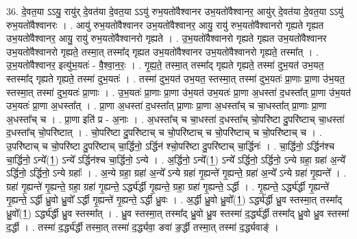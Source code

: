 \documentclass[17pt]{extarticle}
\begin{document}
36. दे॒वत॒या ऽऽयु॒ रायु॑र् दे॒वत॑या दे॒वत॒या ऽऽयु॑ रुभ॒यतो॑वैश्वानर उभ॒यतो॑वैश्वानर॒ आयु॑र् दे॒वत॑या दे॒वत॒या ऽऽयु॑ रुभ॒यतो॑वैश्वानरः । . आयु॑ रुभ॒यतो॑वैश्वानर उभ॒यतो॑वैश्वानर॒ आयु॒ रायु॑ रुभ॒यतो॑वैश्वानरो गृह्यते गृह्यत उभ॒यतो॑वैश्वानर॒ आयु॒ रायु॑ रुभ॒यतो॑वैश्वानरो गृह्यते । . उ॒भ॒यतो॑वैश्वानरो गृह्यते गृह्यत उभ॒यतो॑वैश्वानर उभ॒यतो॑वैश्वानरो गृह्यते॒ तस्मा॒त् तस्मा᳚द् गृह्यत उभ॒यतो॑वैश्वानर उभ॒यतो॑वैश्वानरो गृह्यते॒ तस्मा᳚त् । . उ॒भ॒यतो॑वैश्वानर॒ इत्यु॑भ॒यतः॑ - वै॒श्वा॒न॒रः॒ । . गृ॒ह्य॒ते॒ तस्मा॒त् तस्मा᳚द् गृह्यते गृह्यते॒ तस्मा॑ दुभ॒यत॑ उभ॒यत॒ स्तस्मा᳚द् गृह्यते गृह्यते॒ तस्मा॑ दुभ॒यतः॑ । . तस्मा॑ दुभ॒यत॑ उभ॒यत॒ स्तस्मा॒त् तस्मा॑ दुभ॒यतः॑ प्रा॒णाः प्रा॒णा उ॑भ॒यत॒ स्तस्मा॒त् तस्मा॑ दुभ॒यतः॑ प्रा॒णाः । . उ॒भ॒यतः॑ प्रा॒णाः प्रा॒णा उ॑भ॒यत॑ उभ॒यतः॑ प्रा॒णा अ॒धस्ता॑ द॒धस्ता᳚त् प्रा॒णा उ॑भ॒यत॑ उभ॒यतः॑ प्रा॒णा अ॒धस्ता᳚त् । . प्रा॒णा अ॒धस्ता॑ द॒धस्ता᳚त् प्रा॒णाः प्रा॒णा अ॒धस्ता᳚च् च चा॒धस्ता᳚त् प्रा॒णाः प्रा॒णा अ॒धस्ता᳚च् च । . प्रा॒णा इति॑ प्र - अ॒नाः । . अ॒धस्ता᳚च् च चा॒धस्ता॑ द॒धस्ता᳚च् चो॒परि॑ष्टा दु॒परि॑ष्टाच् चा॒धस्ता॑ द॒धस्ता᳚च् चो॒परि॑ष्टात् । . चो॒परि॑ष्टा दु॒परि॑ष्टाच् च चो॒परि॑ष्टाच् च चो॒परि॑ष्टाच् च चो॒परि॑ष्टाच् च । . उ॒परि॑ष्टाच् च चो॒परि॑ष्टा दु॒परि॑ष्टाच् चा॒र्द्धिनो॒ ऽर्द्धिन॑ श्चो॒परि॑ष्टा दु॒परि॑ष्टाच् चा॒र्द्धिनः॑ । . चा॒र्द्धिनो॒ ऽर्द्धिन॑श्च चा॒र्द्धिनो॒ ऽन्ये᳚(1॒) ऽन्ये᳚ ऽर्द्धिन॑श्च चा॒र्द्धिनो॒ ऽन्ये । . अ॒र्द्धिनो॒ ऽन्ये᳚(1॒) ऽन्ये᳚ ऽर्द्धिनो॒ ऽर्द्धिनो॒ ऽन्ये ग्रहा॒ ग्रहा॑ अ॒न्ये᳚ ऽर्द्धिनो॒ ऽर्द्धिनो॒ ऽन्ये ग्रहाः᳚ । . अ॒न्ये ग्रहा॒ ग्रहा॑ अ॒न्ये᳚ ऽन्ये ग्रहा॑ गृ॒ह्यन्ते॑ गृ॒ह्यन्ते॒ ग्रहा॑ अ॒न्ये᳚ ऽन्ये ग्रहा॑ गृ॒ह्यन्ते᳚ । . ग्रहा॑ गृ॒ह्यन्ते॑ गृ॒ह्यन्ते॒ ग्रहा॒ ग्रहा॑ गृ॒ह्यन्ते॒ ऽर्द्ध्य॑र्द्धी गृ॒ह्यन्ते॒ ग्रहा॒ ग्रहा॑ गृ॒ह्यन्ते॒ ऽर्द्धी । . गृ॒ह्यन्ते॒ ऽर्द्ध्य॑र्द्धी गृ॒ह्यन्ते॑ गृ॒ह्यन्ते॒ ऽर्द्धी ध्रु॒वो ध्रु॒वो᳚ ऽर्द्धी गृ॒ह्यन्ते॑ गृ॒ह्यन्ते॒ ऽर्द्धी ध्रु॒वः । . अ॒र्द्धी ध्रु॒वो ध्रु॒वो᳚(1॒) ऽर्द्ध्य॑र्द्धी ध्रु॒व स्तस्मा॒त् तस्मा᳚द् ध्रु॒वो᳚(1॒) ऽर्द्ध्य॑र्द्धी ध्रु॒व स्तस्मा᳚त् । . ध्रु॒व स्तस्मा॒त् तस्मा᳚द् ध्रु॒वो ध्रु॒व स्तस्मा॑ द॒र्द्ध्य॑र्द्धी तस्मा᳚द् ध्रु॒वो ध्रु॒व स्तस्मा॑ द॒र्द्धी । . तस्मा॑ द॒र्द्ध्य॑र्द्धी तस्मा॒त् तस्मा॑ द॒र्द्ध्यवा॒ ङवा॑ ङ॒र्द्धी तस्मा॒त् तस्मा॑ द॒र्द्ध्यवाङ्॑ । \newline
\pagebreak
{}
\end{document}
